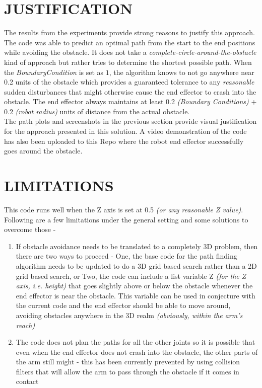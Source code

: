 \documentclass[a4paper]{article}
\begin{document}
\section{JUSTIFICATION}
The results from the experiments provide strong reasons to justify this approach. The code was able to predict an optimal path from the start to the end positions while avoiding the obstacle. It does not take a {\it complete-circle-around-the-obstacle} kind of approach but rather tries to determine the shortest possible path. When the {\it BoundaryCondition} is set as $1$, the algorithm knows to not go anywhere near 0.2 units of the obstacle which provides a guaranteed tolerance to any {\it reasonable} sudden disturbances that might otherwise cause the end effector to crash into the obstacle. The end effector always maintains at least 0.2 {\it(Boundary Conditions)} + 0.2 {\it(robot radius)} units of distance from the actual obstacle.\\

The path plots and screenshots in the previous section provide visual justification for the approach presented in this solution. A video demonstration of the code has also been uploaded to this Repo where the robot end effector successfully goes around the obstacle.
\bigskip

\section{LIMITATIONS}

This code runs well when the Z axis is set at 0.5 {\it(or any reasonable Z value)}. Following are a few limitations under the general setting and some solutions to overcome those - 
\begin{enumerate}
    \item If obstacle avoidance needs to be translated to a completely 3D problem, then there are two ways to proceed - One, the base code for the path finding algorithm needs to be updated to do a 3D grid based search rather than a 2D grid based search, or Two, the code can include a list variable Z {\it(for the Z axis, i.e. height)} that goes slightly above or below the obstacle whenever the end effector is near the obstacle. This variable can be used in conjecture with the current code and the end effector should be able to move around, avoiding obstacles anywhere in the 3D realm {\it(obviously, within the arm's reach)}
    \item The code does not plan the paths for all the other joints so it is possible that even when the end effector does not crash into the obstacle, the other parts of the arm still might - this has been currently prevented by using collision filters that will allow the arm to pass through the obstacle if it comes in contact
\end{enumerate}
\end{document}
